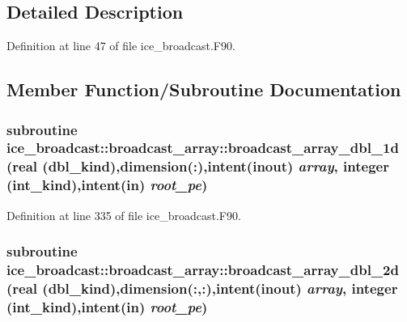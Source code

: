 \subsection{Detailed Description}


Definition at line 47 of file ice\_\-broadcast.F90.

\subsection{Member Function/Subroutine Documentation}
\hypertarget{interfaceice__broadcast_1_1broadcast__array_a1fbf86d91801935df2e994492360c87e}{
\subsubsection[{broadcast\_\-array\_\-dbl\_\-1d}]{\setlength{\rightskip}{0pt plus 5cm}subroutine ice\_\-broadcast::broadcast\_\-array::broadcast\_\-array\_\-dbl\_\-1d (real (dbl\_\-kind),dimension(:),intent(inout) {\em array}, \/  integer (int\_\-kind),intent(in) {\em root\_\-pe})}}
\label{interfaceice__broadcast_1_1broadcast__array_a1fbf86d91801935df2e994492360c87e}


Definition at line 335 of file ice\_\-broadcast.F90.\hypertarget{interfaceice__broadcast_1_1broadcast__array_aae7fab0c9bc036988e2a3d63db3249ce}{
\subsubsection[{broadcast\_\-array\_\-dbl\_\-2d}]{\setlength{\rightskip}{0pt plus 5cm}subroutine ice\_\-broadcast::broadcast\_\-array::broadcast\_\-array\_\-dbl\_\-2d (real (dbl\_\-kind),dimension(:,:),intent(inout) {\em array}, \/  integer (int\_\-kind),intent(in) {\em root\_\-pe})}}
\label{interfaceice__broadcast_1_1broadcast__array_aae7fab0c9bc036988e2a3d63db3249ce}


